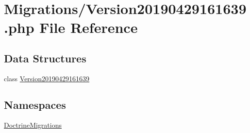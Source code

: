 \hypertarget{_version20190429161639_8php}{}\section{Migrations/\+Version20190429161639.php File Reference}
\label{_version20190429161639_8php}
\subsection*{Data Structures}
\begin{DoxyCompactItemize}
\item 
class \mbox{\hyperlink{class_doctrine_migrations_1_1_version20190429161639}{Version20190429161639}}
\end{DoxyCompactItemize}
\subsection*{Namespaces}
\begin{DoxyCompactItemize}
\item 
 \mbox{\hyperlink{namespace_doctrine_migrations}{Doctrine\+Migrations}}
\end{DoxyCompactItemize}
